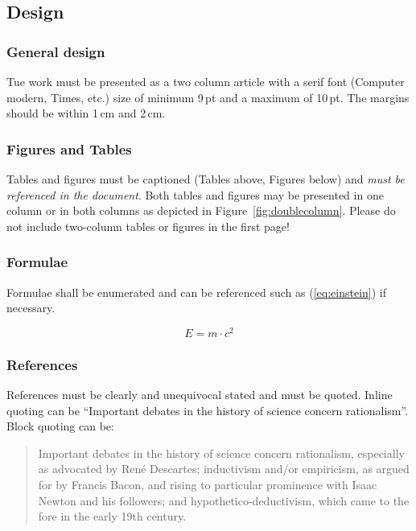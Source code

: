 \documentclass[a4paper, 10pt]{IEEEtran}
\begin{document}
	\subsection{Design}
	
	\subsubsection{General design}
	
	Tue work must be presented as a two column article with a serif font (Computer modern, Times, etc.)  size of minimum 9\,pt and a maximum of 10\,pt. The margins should be within 1\,cm and 2\,cm.
	
	\subsubsection{Figures and Tables}
	Tables and figures must be captioned (Tables above, Figures below) and \emph{must be referenced in the document}. Both tables and figures may be presented in one column or in both columns as depicted in Figure~\ref{fig:doublecolumn}. Please do not include two-column tables or figures in the first page!
	

	
	\subsubsection{Formulae}
	Formulae shall be enumerated and can be referenced such as (\ref{eq:einstein}) if necessary.
	
	\begin{equation}
		E=m\cdot c^2 \label{eq:einstein}
	\end{equation}
	
	\subsubsection{References}
	References must be clearly and unequivocal stated and must be quoted. Inline quoting can be ``Important debates in the history of science concern rationalism''\cite{scientificMethod}. Block quoting can be:
	\begin{quotation}
		Important debates in the history of science concern rationalism, especially as advocated by René Descartes; inductivism and/or empiricism, as argued for by Francis Bacon, and rising to particular prominence with Isaac Newton and his followers; and hypothetico-deductivism, which came to the fore in the early 19th century.\cite{scientificMethod}
	\end{quotation}
	
\end{document}
